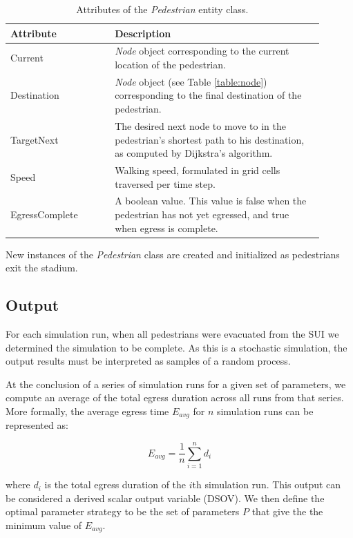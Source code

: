 \documentclass[12pt]{article}
\begin{document}
\def\arraystretch{1.5}
\begin{table}[hb!]
  \centering
    \begin{tabular}{p{0.3\linewidth}p{0.6\linewidth}}
     \hline
     Attribute & Description \\
     \hline
     Current        & \textit{Node} object corresponding to the current
                      location of the pedestrian. \\
     Destination    & \textit{Node} object (see Table \ref{table:node})
                      corresponding to the final destination of the
                      pedestrian. \\
     TargetNext     & The desired next node to move to in the pedestrian's
                      shortest path to his destination, as computed by
                      Dijkstra's algorithm. \\
     Speed          & Walking speed, formulated in grid cells traversed per
                      time step. \\
     EgressComplete & A boolean value. This value is false when the pedestrian
                      has not yet egressed, and true when egress is complete. \\
     \hline
    \end{tabular}
    \caption{Attributes of the \textit{Pedestrian} entity class.}
  \label{table:ped}
\end{table}

New instances of the \textit{Pedestrian} class are created and initialized
as pedestrians exit the stadium.

\subsection{Output}
For each simulation run, when all pedestrians were evacuated from the SUI we
determined the simulation to be complete. As this is a stochastic simulation,
the output results must be interpreted as samples of a random process.

At the conclusion of a series of simulation runs for a given set of parameters,
we compute an average of the total egress duration across all runs from that
series. More formally, the average egress time $E_{avg}$ for $n$ simulation runs
can be represented as:

\begin{equation}
E_{avg} = \frac{1}{n}\sum\limits_{i=1}^n d_i
\end{equation}

where $d_i$ is the total egress duration of the $i$th simulation run. This
output can be considered a derived scalar output variable (DSOV). We then
define the optimal parameter strategy to be the set of parameters $P$ that
give the the minimum value of $E_{avg}$.
\end{document}

